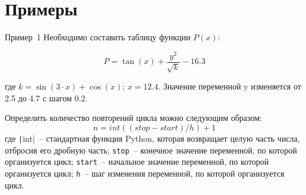 \documentclass[aspectratio=169, mathserif]{beamer}	%
\begin{document}
%
%
%    
%


\section{Примеры}
\sectionframe

\begin{frame}[fragile]{Пример~1}
\scriptsize
Необходимо составить таблицу функции $P(x)$:
\begin{Large}
\begin{equation*}
	P = \tan \left(x \right) + \dfrac{y^2}{\sqrt{k}} - 16.3
\end{equation*} 
\end{Large}
где $k = \sin \left(3 \cdot x\right) + \cos\left(x \right)$; \quad $x = 12.4$.
Значение переменной y изменяется от 2.5 до 4.7 с шагом 0.2. 

\bigskip
Определить количество повторений цикла можно следующим образом:
\begin{equation*}
	n = int \left(\left(stop - start\right)/h\right) + 1
\end{equation*}
где \texttt|int|~-- стандартная функция Python, которая возвращает целую часть числа, отбросив его дробную часть; \texttt{stop}~-- конечное значение переменной, по которой организуется цикл; \texttt{start}~-- начальное значение переменной, по которой организуется цикл; \texttt{h}~-- шаг изменения переменной, по которой организуется цикл.
\vfill
\end{frame}
\end{document}
